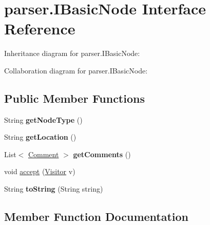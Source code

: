 \hypertarget{interfaceparser_1_1_i_basic_node}{}\section{parser.\+I\+Basic\+Node Interface Reference}
\label{interfaceparser_1_1_i_basic_node}


Inheritance diagram for parser.\+I\+Basic\+Node\+:


Collaboration diagram for parser.\+I\+Basic\+Node\+:
\subsection*{Public Member Functions}
\begin{DoxyCompactItemize}
\item 
String {\bfseries get\+Node\+Type} ()\hypertarget{interfaceparser_1_1_i_basic_node_ae23faedd041599f38173d788ebc18e15}{}\label{interfaceparser_1_1_i_basic_node_ae23faedd041599f38173d788ebc18e15}

\item 
String {\bfseries get\+Location} ()\hypertarget{interfaceparser_1_1_i_basic_node_ac786cb72c4243ee056c1114743dfde46}{}\label{interfaceparser_1_1_i_basic_node_ac786cb72c4243ee056c1114743dfde46}

\item 
List$<$ \hyperlink{classparser_1_1_comment}{Comment} $>$ {\bfseries get\+Comments} ()\hypertarget{interfaceparser_1_1_i_basic_node_ae7b40ab0f60c267fddd8bbedb903a03a}{}\label{interfaceparser_1_1_i_basic_node_ae7b40ab0f60c267fddd8bbedb903a03a}

\item 
void \hyperlink{interfaceparser_1_1_i_basic_node_af8790b7076c59e00781ba3d4118757cd}{accept} (\hyperlink{interfacemain_1_1_visitor}{Visitor} v)
\item 
String {\bfseries to\+String} (String string)\hypertarget{interfaceparser_1_1_i_basic_node_a9718f35b0d014800b3b4f4094ff859de}{}\label{interfaceparser_1_1_i_basic_node_a9718f35b0d014800b3b4f4094ff859de}

\end{DoxyCompactItemize}


\subsection{Member Function Documentation}
